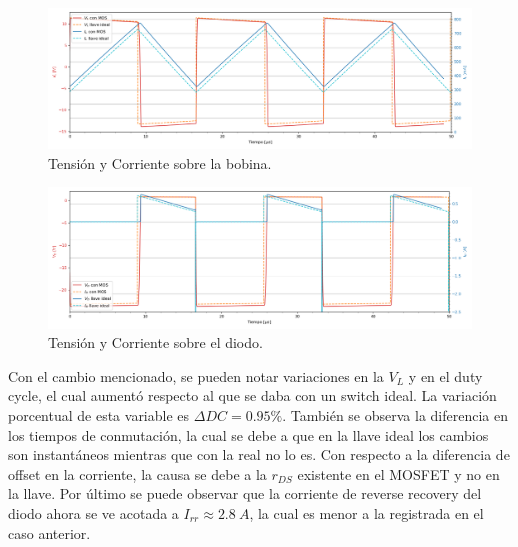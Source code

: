 \begin{multicols}{2}
\begin{figure}[H]
	\centering
	\includegraphics[width=\linewidth]{ImagenesEjercicio-3/il-vl-2v3}
	\caption{Tensión y Corriente sobre la bobina.}
	\label{fig:ej3:Il_Vl}
\end{figure}
\begin{figure}[H]
	\centering
	\includegraphics[width=\linewidth]{ImagenesEjercicio-3/id-vd-2v3}
	\caption{Tensión y Corriente sobre el diodo.}
	\label{fig:ej3:Id_Vd}
\end{figure}
\end{multicols}

Con el cambio mencionado, se pueden notar variaciones en la $V_L$ y en el duty cycle, el cual aumentó respecto al que se daba con un switch ideal. La variación porcentual de esta variable es $\Delta DC = 0.95 \% $. También se observa la diferencia en los tiempos de conmutación, la cual se debe a que en la llave ideal los cambios son instantáneos mientras que con la real no lo es. Con respecto a la diferencia de offset en la corriente, la causa se debe a la $r_{DS}$ existente en el MOSFET y no en la llave. Por último se puede observar que la corriente de reverse recovery del diodo ahora se ve acotada a $I_{rr}\approx 2.8 \ A$, la cual es menor a la registrada en el caso anterior.

